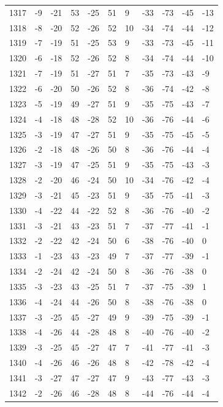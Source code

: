 \begin{table}[H]
\begin{tabular}{lllllllllll}
1317 & -9 & -21 & 53 & -25 & 51 & 9 & -33 & -73 & -45 & -13 \\
1318 & -8 & -20 & 52 & -26 & 52 & 10 & -34 & -74 & -44 & -12 \\
1319 & -7 & -19 & 51 & -25 & 53 & 9 & -33 & -73 & -45 & -11 \\
1320 & -6 & -18 & 52 & -26 & 52 & 8 & -34 & -74 & -44 & -10 \\
1321 & -7 & -19 & 51 & -27 & 51 & 7 & -35 & -73 & -43 & -9 \\
1322 & -6 & -20 & 50 & -26 & 52 & 8 & -36 & -74 & -42 & -8 \\
1323 & -5 & -19 & 49 & -27 & 51 & 9 & -35 & -75 & -43 & -7 \\
1324 & -4 & -18 & 48 & -28 & 52 & 10 & -36 & -76 & -44 & -6 \\
1325 & -3 & -19 & 47 & -27 & 51 & 9 & -35 & -75 & -45 & -5 \\
1326 & -2 & -18 & 48 & -26 & 50 & 8 & -36 & -76 & -44 & -4 \\
1327 & -3 & -19 & 47 & -25 & 51 & 9 & -35 & -75 & -43 & -3 \\
1328 & -2 & -20 & 46 & -24 & 50 & 10 & -34 & -76 & -42 & -4 \\
1329 & -3 & -21 & 45 & -23 & 51 & 9 & -35 & -75 & -41 & -3 \\
1330 & -4 & -22 & 44 & -22 & 52 & 8 & -36 & -76 & -40 & -2 \\
1331 & -3 & -21 & 43 & -23 & 51 & 7 & -37 & -77 & -41 & -1 \\
1332 & -2 & -22 & 42 & -24 & 50 & 6 & -38 & -76 & -40 & 0 \\
1333 & -1 & -23 & 43 & -23 & 49 & 7 & -37 & -77 & -39 & -1 \\
1334 & -2 & -24 & 42 & -24 & 50 & 8 & -36 & -76 & -38 & 0 \\
1335 & -3 & -23 & 43 & -25 & 51 & 7 & -37 & -75 & -39 & 1 \\
1336 & -4 & -24 & 44 & -26 & 50 & 8 & -38 & -76 & -38 & 0 \\
1337 & -3 & -25 & 45 & -27 & 49 & 9 & -39 & -75 & -39 & -1 \\
1338 & -4 & -26 & 44 & -28 & 48 & 8 & -40 & -76 & -40 & -2 \\
1339 & -3 & -25 & 45 & -27 & 47 & 7 & -41 & -77 & -41 & -3 \\
1340 & -4 & -26 & 46 & -26 & 48 & 8 & -42 & -78 & -42 & -4 \\
1341 & -3 & -27 & 47 & -27 & 47 & 9 & -43 & -77 & -43 & -3 \\
1342 & -2 & -26 & 46 & -28 & 48 & 8 & -44 & -76 & -44 & -4 \\

\end{tabular}
\end{table}
